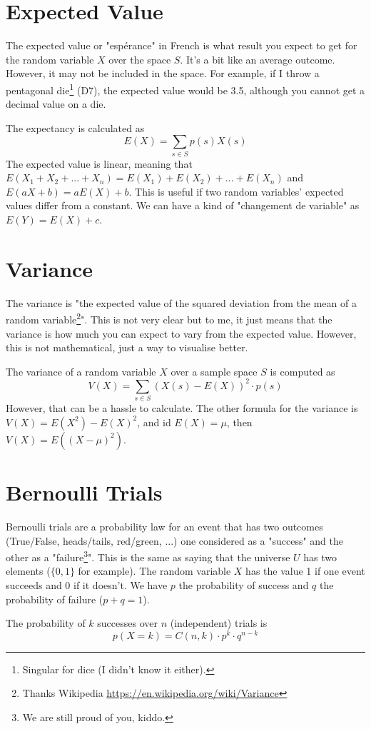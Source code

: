 \documentclass[10pt,a4paper]{book}
\begin{document}
\section{Expected Value}
The expected value or "espérance" in French is what result you expect to get for the random variable $X$ over the space $S$. It's a bit like an average outcome. However, it may not be included in the space. For example, if I throw a pentagonal die\footnote{Singular for dice (I didn't know it either).} (D7), the expected value would be 3.5, although you cannot get a decimal value on a die.\par 
The expectancy is calculated as
\[E(X)=\sum_{s\in S}p(s)X(s)\]
The expected value is linear, meaning that $E(X_1+X_2+...+X_n)=E(X_1)+E(X_2)+...+E(X_n)$ and $E(aX+b)=aE(X)+b$. This is useful if two random variables' expected values differ from a constant. We can have a kind of "changement de variable" as $E(Y)=E(X)+c$.
\section{Variance}
The variance is "the expected value of the squared deviation from the mean of a random variable\footnote{Thanks Wikipedia \url{https://en.wikipedia.org/wiki/Variance}}". This is not very clear but to me, it just means that the variance is how much you can expect to vary from the expected value. However, this is not mathematical, just a way to visualise better.\par 
The variance of a random variable $X$ over a sample space $S$ is computed as 
\[V(X)=\sum_{s\in S}(X(s)-E(X))^2\cdot p(s)\]
However, that can be a hassle to calculate. The other formula for the variance is $V(X)=E(X^2)-E(X)^2$, and id $E(X)=\mu$, then $V(X)=E((X-\mu)^2)$.
\section{Bernoulli Trials}
Bernoulli trials are a probability law for an event that has two outcomes (True/False, heads/tails, red/green, ...) one considered as a "success" and the other as a "failure\footnote{We are still proud of you, kiddo.}". This is the same as saying that the universe $U$ has two elements ($\{0,1\}$ for example). The random variable $X$ has the value 1 if one event succeeds and 0 if it doesn't. We have $p$ the probability of success and $q$ the probability of failure ($p+q=1$). \par 
The probability of $k$ successes over $n$ (independent) trials is 
\[p(X=k)=C(n,k)\cdot p^k\cdot q^{n-k}\]
\end{document}
